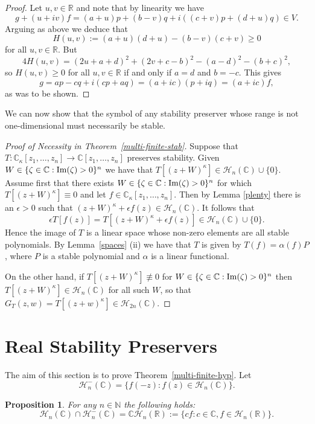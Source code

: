 \documentclass[10pt,reqno]{amsart}
\theoremstyle{plain}
\newtheorem{proposition}[theorem]{Proposition}
\theoremstyle{definition}
\theoremstyle{remark}
\numberwithin{equation}{section}
\newcommand{\NN}{\mathbb{N}}
\newcommand{\HH}{\mathcal{H}}
\newcommand{\RR}{\mathbb{R}}
\newcommand{\CC}{\mathbb{C}}
\renewcommand{\Im}{{\rm Im}}
\begin{document}
\begin{proof}
Let $u,v\in\RR$ and note that by linearity we have 
$$g+(u+iv)f =(a+u)p+(b-v)q+i( (c+v)p+(d+u)q)    \in V.
$$ 
Arguing as above we deduce that 
$$
H(u,v):=(a+u)(d+u)-(b-v)(c+v) \geq 0 
$$
for all $u,v \in \RR$. But 
$$
4H(u,v)=(2u+a+d)^2+(2v+c-b)^2-(a-d)^2-(b+c)^2,
$$
so $H(u,v) \geq 0$ for all $u,v \in \RR$ if and only if $a=d$ and $b=-c$. 
This gives  
$$
g=ap-cq+i(cp+aq)=(a+ic)(p+iq)=(a+ic)f,
$$
as was to be shown.
\end{proof}

We can now show that the symbol of any stability preserver whose 
range is not one-dimensional must necessarily be stable. 

\begin{proof}[Proof of Necessity in Theorem~\ref{multi-finite-stab}]
Suppose that 
$T : \CC_\kappa[z_1,\ldots, z_n] \rightarrow \CC[z_1,\ldots,z_n]$  
preserves stability. 
Given $W \in \{\zeta \in \CC: \Im(\zeta)>0\}^n$  we have that 
$T[(z+W)^\kappa] \in \HH_{n}(\CC)\cup\{0\}$. Assume first that there exists   
$W \in \{\zeta \in \CC: \Im(\zeta)>0\}^n$ for which $T[(z+W)^\kappa]\equiv 0$
and let $f \in \CC_\kappa[z_1,\ldots, z_n]$. Then by Lemma \ref{plenty} 
there is an $\epsilon>0$ such that 
$(z+W)^\kappa + \epsilon f(z) \in  \HH_n(\CC)$.   
It follows that 
$$
\epsilon T[f(z)]=T[(z+W)^\kappa + \epsilon f(z)] \in \HH_n(\CC)\cup \{0\}.
$$
Hence the image of $T$ is a linear space whose non-zero elements are all 
stable polynomials. By Lemma~\ref{spaces} (ii) we have that 
$T$ is given by $T(f) =\alpha(f)P$, where $P$ is a stable polynomial and 
$\alpha$ is a linear functional. 

On the other hand, if $T[(z+W)^\kappa]\not\equiv 0$ for 
$W \in \{\zeta \in \CC: \Im(\zeta)>0\}^n$ then 
$T[(z+W)^\kappa] \in \HH_{n}(\CC)$ for all such $W$, so that 
$G_T(z,w)=T[(z+w)^\kappa] \in \HH_{2n}(\CC)$. 
\end{proof}

\section{Real Stability Preservers}\label{s-7}

The aim of this section is to prove Theorem~\ref{multi-finite-hyp}.
Let 
$$
\HH_n^{-}(\CC)= \{ f(-z): f(z) \in \HH_n(\CC)\}.
$$ 

\begin{proposition}\label{intersection}
For any $n\in\NN$ the following holds:
$$\HH_n(\CC) \cap \HH_n^{-}(\CC)= \CC \HH_n(\RR) 
:= \{ cf: c \in \CC, f \in \HH_n(\RR) \}.$$
\end{proposition}
\end{document}
